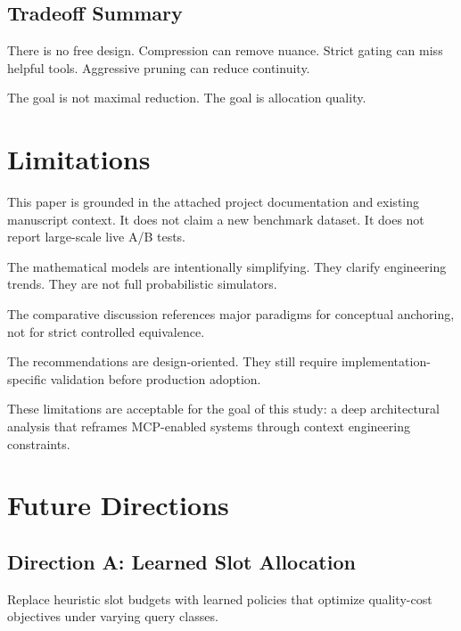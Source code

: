\documentclass[conference]{IEEEtran}
\begin{document}
\subsection{Tradeoff Summary}

There is no free design.
Compression can remove nuance.
Strict gating can miss helpful tools.
Aggressive pruning can reduce continuity.

The goal is not maximal reduction.
The goal is allocation quality.

\section{Limitations}
\label{sec:limitations}

This paper is grounded in the attached project documentation and existing manuscript context.
It does not claim a new benchmark dataset.
It does not report large-scale live A/B tests.

The mathematical models are intentionally simplifying.
They clarify engineering trends.
They are not full probabilistic simulators.

The comparative discussion references major paradigms for conceptual anchoring,
not for strict controlled equivalence.

The recommendations are design-oriented.
They still require implementation-specific validation before production adoption.

These limitations are acceptable for the goal of this study:
a deep architectural analysis that reframes MCP-enabled systems through context engineering constraints.

\section{Future Directions}
\label{sec:future}

\subsection{Direction A: Learned Slot Allocation}

Replace heuristic slot budgets with learned policies that optimize quality-cost objectives under varying query classes.
\end{document}
